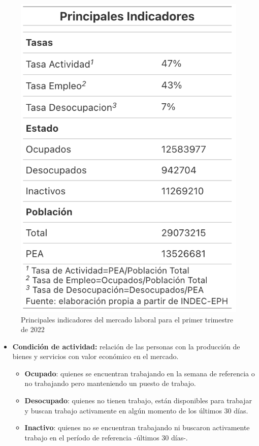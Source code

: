 \documentclass[a4paper]{article}
\theoremstyle{plain}
\theoremstyle{definition}
\begin{document}
\begin{figure}[h]
    \centering
    \includegraphics[scale=0.7]{figuras/principales_indicadores_mercado_laboral_2022.png}
    \caption{Principales indicadores del mercado laboral para el primer trimestre de 2022}
    \label{fig:distribucion_del_ingreso}
\end{figure}
\begin{itemize}
        \item \textbf{Condición de actividad: }relación de las personas con la producción de bienes y servicios con valor económico en el mercado.
\begin{itemize}
        \item \textbf{Ocupado}: quienes se encuentran trabajando en la semana de referencia o no trabajando pero manteniendo un puesto de trabajo.
        \item \textbf{Desocupado}: quienes no tienen trabajo, están disponibles para trabajar y buscan trabajo activamente en algún momento de los últimos 30 días.
        \item \textbf{Inactivo}: quienes no se encuentran trabajando ni buscaron activamente trabajo en el período de referencia -últimos 30 días-.
 \end{itemize}
 \end{itemize}
\end{document}
